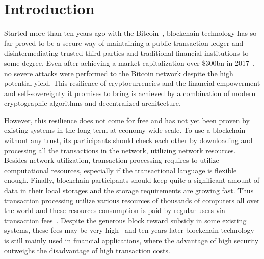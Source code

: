 \section{Introduction}
\label{sec:intro}


Started more than ten years ago with the Bitcoin~\cite{nakamoto2008bitcoin}, blockchain technology has so far proved
to be a secure way of maintaining a public transaction ledger and disintermediating trusted third parties and
traditional financial institutions to some degree.
Even after achieving a market capitalization over \$300bn in 2017~\cite{btcPrice},
no severe attacks were performed to the Bitcoin network despite the high potential yield.
This resilience of cryptocurrencies and the financial empowerment and self-sovereignty it promises to bring is
achieved by a combination of modern cryptographic algorithms and decentralized architecture.

However, this resilience does not come for free and has not yet been proven by existing systems in the long-term at economy wide-scale.
To use a blockchain without any trust, its participants should check each other by downloading and
processing all the transactions in the network, utilizing network resources.
Besides network utilization, transaction processing requires to utilize computational resources,
especially if the transactional language is flexible enough.
Finally, blockchain participants should keep quite a significant amount of data in their local storages and
the storage requirements are growing fast.
Thus transaction processing utilize various resources of thousands of computers all over the world
and these resources consumption is paid by regular users via transaction fees~\cite{chepurnoy2018systematic}.
Despite the generous block reward subsidy in some existing systems, these fees may be very high~\cite{bitcoinFees}
and ten years later blockchain technology is still mainly used in financial applications, where the advantage of
high security outweighs the disadvantage of high transaction costs.

